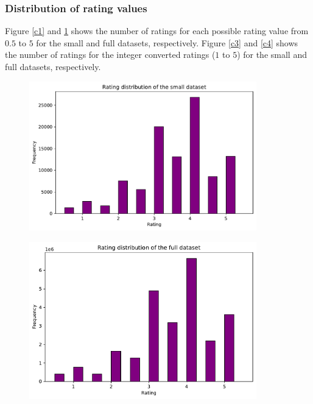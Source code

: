 \documentclass{article}
\begin{document}
\subsubsection{Distribution of rating values}
Figure \ref{c1} and \ref{c2} shows the number of ratings for each possible rating value
from $0.5$ to $5$ for the small and full datasets, respectively. 
Figure \ref{c3} and \ref{c4} shows the number of ratings for the integer converted ratings 
($1$ to $5$) for the small and full datasets, respectively.

\begin{figure}[h!]
    \centering
    \begin{minipage}{.5\textwidth}
      \centering
      \captionsetup{justification=centering}
      \includegraphics[width=0.88\textwidth]{graphics/small_ratings_dist_2.pdf}
      \label{c1}
    \end{minipage}%
    \begin{minipage}{.5\textwidth}
      \centering
      \captionsetup{justification=centering}
      \includegraphics[width=0.88\textwidth]{graphics/full_ratings_dist_2.pdf}
      \label{c2}
    \end{minipage}
\end{figure}
\end{document}
